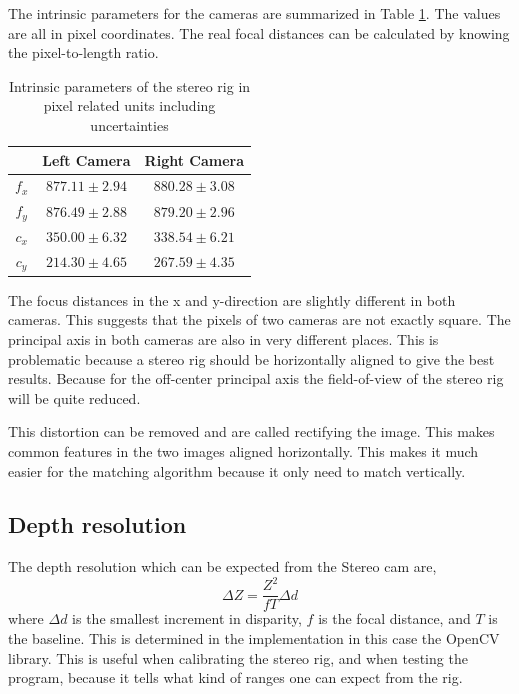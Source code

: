 The intrinsic parameters for the cameras are summarized in Table
\ref{chap3:tab-intrinsic-stereo}. The values are all in pixel coordinates. The real focal
distances can be calculated by knowing the pixel-to-length ratio.
\begin{table}[htbp]
  \centering
    \begin{tabular}{|c|c|c|} 
        \hline
                & Left Camera       & Right Camera \\
        \hline
        $f_x$   & $877.11\pm 2.94$  & $880.28\pm 3.08$  \\
        $f_y$   & $876.49\pm 2.88$  & $879.20\pm 2.96$  \\
        \hline
        $c_x$   & $350.00\pm 6.32$  & $338.54\pm 6.21$ \\
        $c_y$   & $214.30\pm 4.65$ & $267.59\pm 4.35$  \\
        \hline
    \end{tabular}
    \caption{Intrinsic parameters of the stereo rig in pixel related units including
    uncertainties}
    \label{chap3:tab-intrinsic-stereo}
\end{table}
The focus distances in the x and y-direction are slightly different in both cameras. This
suggests that the pixels of two cameras are not exactly square. The principal axis in both
cameras are also in very different places. This is problematic because a stereo rig should
be horizontally aligned to give the best results. Because for the off-center principal
axis the field-of-view of the stereo rig will be quite reduced.


This distortion can be removed and are called rectifying the image. This makes common
features in the two images aligned horizontally. This makes it much easier for the matching
algorithm because it only need to match vertically.


\subsection{Depth resolution}
The depth resolution which can be expected from the Stereo cam are,
\begin{equation}
    \Delta Z = \frac{Z^2}{f T}\Delta d
\end{equation}
where $\Delta d$ is the smallest increment in disparity, $f$ is the focal distance, and
$T$ is the baseline. This is determined in the implementation in this case the OpenCV
library. This is useful when calibrating the stereo rig, and when testing the program,
because it tells what kind of ranges one can expect from the rig.


